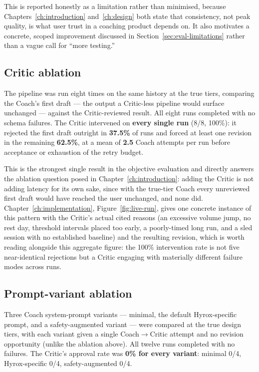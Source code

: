This is reported honestly as a limitation rather than minimised, because Chapters~\ref{ch:introduction} and~\ref{ch:design} both state that consistency, not peak quality, is what user trust in a coaching product depends on. It also motivates a concrete, scoped improvement discussed in Section~\ref{sec:eval-limitations} rather than a vague call for ``more testing.''

\subsection{Critic ablation}

The pipeline was run eight times on the same history at the true tiers, comparing the Coach's first draft --- the output a Critic-less pipeline would surface unchanged --- against the Critic-reviewed result. All eight runs completed with no schema failures. The Critic intervened on \textbf{every single run} (8/8, 100\%): it rejected the first draft outright in \textbf{37.5\%} of runs and forced at least one revision in the remaining \textbf{62.5\%}, at a mean of \textbf{2.5} Coach attempts per run before acceptance or exhaustion of the retry budget.

This is the strongest single result in the objective evaluation and directly answers the ablation question posed in Chapter~\ref{ch:introduction}: adding the Critic is not adding latency for its own sake, since with the true-tier Coach every unreviewed first draft would have reached the user unchanged, and none did. Chapter~\ref{ch:implementation}, Figure~\ref{fig:live-run}, gives one concrete instance of this pattern with the Critic's actual cited reasons (an excessive volume jump, no rest day, threshold intervals placed too early, a poorly-timed long run, and a sled session with no established baseline) and the resulting revision, which is worth reading alongside this aggregate figure: the 100\% intervention rate is not five near-identical rejections but a Critic engaging with materially different failure modes across runs.

\subsection{Prompt-variant ablation}

Three Coach system-prompt variants --- minimal, the default Hyrox-specific prompt, and a safety-augmented variant --- were compared at the true design tiers, with each variant given a single Coach$\to$Critic attempt and no revision opportunity (unlike the ablation above). All twelve runs completed with no failures. The Critic's approval rate was \textbf{0\% for every variant}: minimal 0/4, Hyrox-specific 0/4, safety-augmented 0/4.

